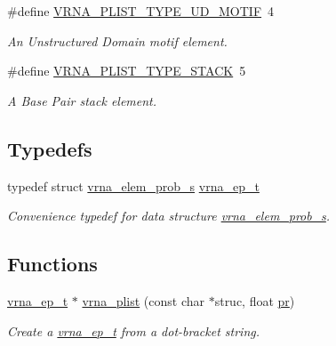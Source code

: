 \begin{DoxyCompactItemize}
\#define \hyperlink{group__struct__utils__plist_ga01d749cdb675dcdbac1dc5103378c699}{V\+R\+N\+A\+\_\+\+P\+L\+I\+S\+T\+\_\+\+T\+Y\+P\+E\+\_\+\+U\+D\+\_\+\+M\+O\+T\+IF}~4
\begin{DoxyCompactList}\small\item\em An Unstructured Domain motif element. \end{DoxyCompactList}\item 
\mbox{\label{group__struct__utils__plist_ga36df728a95452170ca8684fc224299ea}} 
\#define \hyperlink{group__struct__utils__plist_ga36df728a95452170ca8684fc224299ea}{V\+R\+N\+A\+\_\+\+P\+L\+I\+S\+T\+\_\+\+T\+Y\+P\+E\+\_\+\+S\+T\+A\+CK}~5
\begin{DoxyCompactList}\small\item\em A Base Pair stack element. \end{DoxyCompactList}\end{DoxyCompactItemize}
\subsection*{Typedefs}
\begin{DoxyCompactItemize}
\item 
\mbox{\label{group__struct__utils__plist_gab9ac98ab55ded9fb90043b024b915aca}} 
typedef struct \hyperlink{group__struct__utils__plist_structvrna__elem__prob__s}{vrna\+\_\+elem\+\_\+prob\+\_\+s} \hyperlink{group__struct__utils__plist_gab9ac98ab55ded9fb90043b024b915aca}{vrna\+\_\+ep\+\_\+t}
\begin{DoxyCompactList}\small\item\em Convenience typedef for data structure \hyperlink{group__struct__utils__plist_structvrna__elem__prob__s}{vrna\+\_\+elem\+\_\+prob\+\_\+s}. \end{DoxyCompactList}\end{DoxyCompactItemize}
\subsection*{Functions}
\begin{DoxyCompactItemize}
\item 
\hyperlink{group__struct__utils__plist_gab9ac98ab55ded9fb90043b024b915aca}{vrna\+\_\+ep\+\_\+t} $\ast$ \hyperlink{group__struct__utils__plist_gaf002d69024d709744664a8b9ca3dd77d}{vrna\+\_\+plist} (const char $\ast$struc, float \hyperlink{fold__vars_8h_ac98ec419070aee6831b44e5c700f090f}{pr})
\begin{DoxyCompactList}\small\item\em Create a \hyperlink{group__struct__utils__plist_gab9ac98ab55ded9fb90043b024b915aca}{vrna\+\_\+ep\+\_\+t} from a dot-\/bracket string. \end{DoxyCompactList}\end{DoxyCompactItemize}


